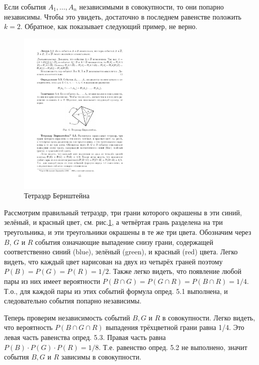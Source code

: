 \begin{zam} 
Если события $A_1, \dots ,A_n$ независимыми в совокупности,
то они попарно независимы. Чтобы это увидеть, достаточно в последнем равенстве положить $k = 2$. Обратное, как показывает следующий пример, не верно.
\end{zam}

\begin{figure}[H]
	\centering
	\includegraphics[width=0.5\textwidth]{pic/pic6.pdf}
	\caption{Тетраэдр Бернштейна}
	\label{pic:6}
\end{figure}

\begin{example}

Рассмотрим правильный тетраэдр, три грани которого окрашены в эти синий, зелёный, и красный цвет, см. рис.\ref{pic:6},
а четвёртая грань разделена на три треугольника, и эти треугольники окрашены в те же три цвета. Обозначим через $B$, $G$ и $R$ события означающие выпадение снизу грани, содержащей соответственно синий (blue), зелёный
(green), и красный (red) цвета.
Легко видеть, что каждый цвет нарисован на двух из четырёх граней
поэтому $P(B) = P(G) = P(R) = 1/2$. Также легко видеть, что появление
любой пары из них имеет вероятности $P(B\cap G) = P(G\cap R) = P(B\cap R) = 1/4$.
Т.о., для каждой пары из этих событий формула опред. 5.1 выполнена, и
следовательно события попарно независимы.

Теперь проверим независимость событий $B, G$ и $R$ в совокупности. Легко
видеть, что вероятность $P(B \cap  G \cap  R)$ выпадения трёхцветной грани равна
1/4. Это левая часть равенства опред. 5.3. Правая часть равна $P(B) \cdot P(G) \cdot
P(R) = 1/8$. Т.е. равенство опред. 5.2 не выполнено, значит события $B, G$
и $R$ зависимы в совокупности.
\end{example}



